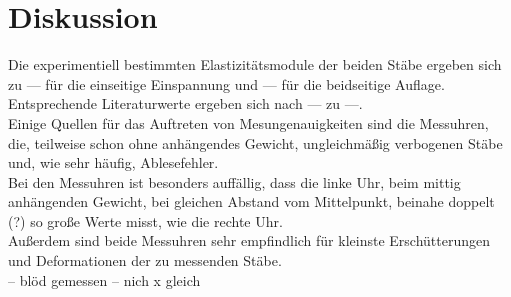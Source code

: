 \section{Diskussion}
\label{sec:Diskussion}

Die experimentiell bestimmten Elastizitätsmodule der beiden Stäbe ergeben sich zu --- für die 
einseitige Einspannung und --- für die beidseitige Auflage. \\
Entsprechende Literaturwerte ergeben sich nach --- zu ---.\\

Einige Quellen für das Auftreten von Mesungenauigkeiten sind die Messuhren, die, teilweise 
schon ohne anhängendes Gewicht, ungleichmäßig verbogenen Stäbe und, wie sehr häufig, Ablesefehler.\\
Bei den Messuhren ist besonders auffällig, dass die linke Uhr, beim mittig anhängenden Gewicht, 
bei gleichen Abstand vom Mittelpunkt, beinahe doppelt (?) so große Werte misst, wie die rechte Uhr.\\
Außerdem sind beide Messuhren sehr empfindlich für kleinste Erschütterungen und Deformationen der zu 
messenden Stäbe.\\

-- blöd gemessen -- nich x gleich